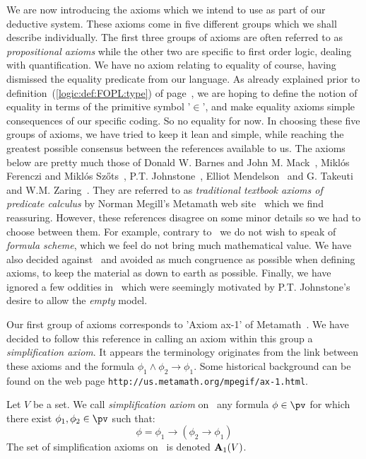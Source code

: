 We are now introducing the axioms which we intend to use as part of
our deductive system. These axioms come in five different groups
which we shall describe individually. The first three groups of
axioms are often referred to as {\em propositional axioms} while the
other two are specific to first order logic, dealing with
quantification. We have no axiom relating to equality of course,
having dismissed the equality predicate from our language. As
already explained prior to definition~(\ref{logic:def:FOPL:type}) of
page~\pageref{logic:def:FOPL:type}, we are hoping to define the
notion of equality in terms of the primitive symbol '$\in$', and
make equality axioms simple consequences of our specific coding. So
no equality for now. In choosing these five groups of axioms, we
have tried to keep it lean and simple, while reaching the greatest
possible consensus between the references available to us. The
axioms below are pretty much those of Donald W. Barnes and John M.
Mack~\cite{AlgLog}, Mikl\'os Ferenczi and Mikl\'os Sz\H
ots~\cite{Ferenczi}, P.T. Johnstone~\cite{Johnstone}, Elliot
Mendelson~\cite{Mendelson} and G. Takeuti and W.M.
Zaring~\cite{Takeuti}. They are referred to as {\em traditional
textbook axioms of predicate calculus} by Norman Megill's Metamath
web site~\cite{Metamath} which we find reassuring. However, these
references disagree on some minor details so we had to choose
between them. For example, contrary to~\cite{Ferenczi} we do not
wish to speak of {\em formula scheme}, which we feel do not bring
much mathematical value. We have also decided against~\cite{AlgLog}
and avoided as much congruence as possible when defining axioms, to
keep the material as down to earth as possible. Finally, we have
ignored a few oddities in~\cite{Johnstone} which were seemingly
motivated by P.T. Johnstone's desire to allow the {\em empty} model.

Our first group of axioms corresponds to 'Axiom ax-1' of
Metamath~\cite{Metamath}. We have decided to follow this reference
in calling an axiom within this group a {\em simplification axiom}.
It appears the terminology originates from the link between these
axioms and the formula $\phi_{1}\land\phi_{2}\to\phi_{1}$. Some
historical background can be found on the web page
\texttt{http://us.metamath.org/mpegif/ax-1.html}.
\begin{defin}\label{logic:def:FOPL:simplification:axiom}
Let $V$ be a set. We call {\em simplification axiom} on \pv\ any
formula $\phi\in\pv$ for which there exist $\phi_{1},\phi_{2}\in\pv$
such that:
    \[
    \phi = \phi_{1}\to(\phi_{2}\to\phi_{1})
    \]
The set of simplification axioms on \pv\ is denoted ${\bf
A}_{1}(V)$.
\end{defin}

